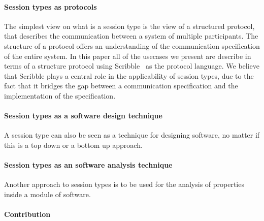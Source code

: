 \paragraph{Session types as protocols}
The simplest view on what is a session type is the view of a
structured protocol, that describes the communication between
a system of multiple participants.
The structure of a protocol offers an understanding of the
communication specification of the entire system.
In this paper all of the usecases we present are describe
in terms of a structure protocol using Scribble~\cite{scribble}
as the protocol language. We believe that Scribble plays a
central role in the applicability of session types, due
to the fact that it bridges the gap between a communication
specification and the implementation of the specification.


\paragraph{Session types as a software design technique}
A session type can also be seen as a technique for designing
software, no matter if this is a top down or a bottom up approach.


\paragraph{Session types as an software analysis technique}
Another approach to session types is to be used for the analysis
of properties inside a module of software.

\paragraph{Contribution}




